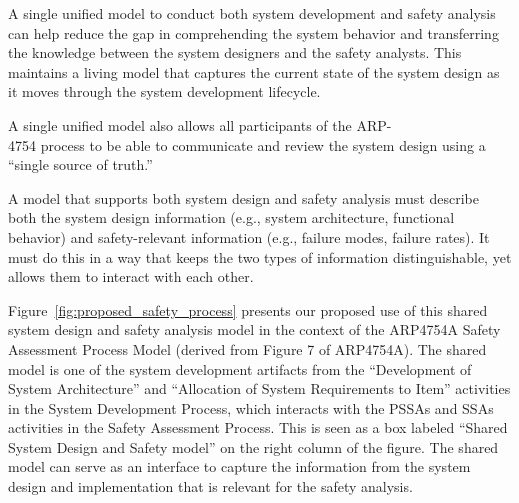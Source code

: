A single unified model to conduct both system development and safety analysis can help reduce the gap in comprehending the system behavior and transferring the knowledge between the system designers and the safety analysts. This maintains a living model that captures the current state of the system design as it moves through the system development lifecycle.

A single unified model also allows all participants of the ARP- \\4754 process to be able to communicate and review the system design using a ``single source of truth.''

A model that supports both system design and safety analysis must describe both the system design information (e.g., system architecture, functional behavior) and safety-relevant information (e.g., failure modes, failure rates).  It must do this in a way that keeps the two types of information distinguishable, yet allows them to interact with each other.

Figure~\ref{fig:proposed_safety_process} presents our proposed use of this shared system design and safety analysis model in the context of the ARP4754A Safety Assessment Process Model (derived from Figure 7 of ARP4754A). The shared model is one of the system development artifacts from the ``Development of System Architecture'' and ``Allocation of System Requirements to Item'' activities in the System Development Process, which interacts with the PSSAs and SSAs activities in the Safety Assessment Process. This is seen as a box labeled ``Shared System Design and Safety model'' on the right column of the figure. The shared model can serve as an interface to capture the information from the system design and implementation that is relevant for the safety analysis.


